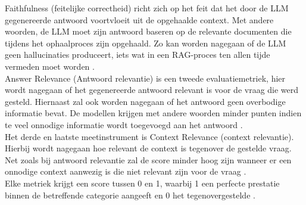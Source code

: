 Faithfulness (feitelijke correctheid) richt zich op het feit dat het door de LLM gegenereerde antwoord voortvloeit uit de opgehaalde context. Met andere woorden, de LLM moet zijn antwoord baseren op de relevante documenten die tijdens het ophaalproces zijn opgehaald. Zo kan worden nagegaan of de LLM geen hallucinaties produceert, iets wat in een RAG-proces ten allen tijde vermeden moet worden \autocite{Es2023}.
\\[1em]
Answer Relevance (Antwoord relevantie) is een tweede evaluatiemetriek, hier wordt nagegaan of het gegenereerde antwoord relevant is voor de vraag die werd gesteld. Hiernaast zal ook worden nagegaan of het antwoord geen overbodige informatie bevat. De modellen krijgen met andere woorden minder punten indien te veel onnodige informatie wordt toegevoegd aan het antwoord \autocite{Es2023}.
\\[1em]
Het derde en laatste meetinstrument is Context Relevance (context relevantie). Hierbij wordt nagegaan hoe relevant de context is tegenover de gestelde vraag. Net zoals bij antwoord relevantie zal de score minder hoog zijn wanneer er een onnodige context aanwezig is die niet relevant zijn voor de vraag \autocite{Es2023}. 
\\[1em]
Elke metriek krijgt een score tussen 0 en 1, waarbij 1 een perfecte prestatie binnen de betreffende categorie aangeeft en 0 het tegenovergestelde \autocite{Es2023}.

